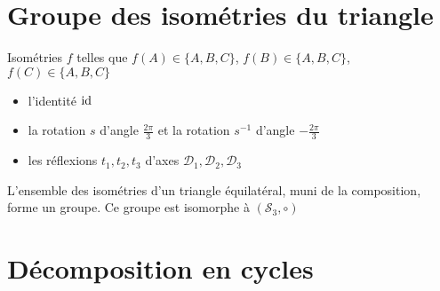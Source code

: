 \section{Groupe des isométries du triangle}

\begin{frame}

\begin{minipage}{0.60\textwidth}
\pause\pause
Isométries $f$ telles que $f(A) \in \{A,B,C\}$,
$f(B) \in \{A,B,C\}$, $f(C) \in \{A,B,C\}$
\pause
\end{minipage}
 \begin{minipage}{0.39\textwidth}
\begin{itemize}
  \item l'identité $\mathop{\text{id}}\nolimits$
\pause
  \item la rotation $s$ d'angle $\frac{2\pi}{3}$ et 
la rotation $s^{-1}$ d'angle $-\frac{2\pi}{3}$
\pause
  \item les réflexions $t_1, t_2, t_3$ d'axes 
$\mathcal{D}_1, \mathcal{D}_2,\mathcal{D}_3$
\end{itemize}
\end{minipage}

\medskip
\pause

\begin{proposition}
L'ensemble des  isométries d'un triangle équilatéral, muni de la composition, forme un groupe.
\pause
Ce groupe est isomorphe à $(\mathcal{S}_3,\circ)$
\end{proposition}

\end{frame}

\section{Décomposition en cycles}



